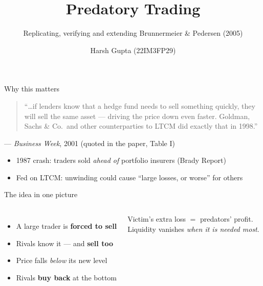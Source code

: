 \documentclass[aspectratio=169,11pt]{beamer}
\title{Predatory Trading}
\subtitle{Replicating, verifying and extending Brunnermeier \& Pedersen (2005)}
\author{Harsh Gupta \quad (22IM3FP29)}
\institute{Market Microstructure \quad$\cdot$\quad Prof.\ Ajay Kumar Mishra\\
  Indian Institute of Technology Kharagpur}
\date{}
\newcommand{\hl}[1]{\textbf{\color{prey}#1}}
\begin{document}
\maketitle

\begin{frame}{Why this matters}
  \begin{quote}
    ``\dots if lenders know that a hedge fund needs to sell something quickly,
    they will sell the same asset --- driving the price down even faster.
    Goldman, Sachs \& Co.\ and other counterparties to LTCM did exactly that in 1998.''
  \end{quote}
  \hfill --- \emph{Business Week}, 2001 (quoted in the paper, Table I)

  \vspace{1em}
  \begin{itemize}
    \item 1987 crash: traders sold \emph{ahead of} portfolio insurers (Brady Report)
    \item Fed on LTCM: unwinding could cause ``large losses, or worse'' for others
  \end{itemize}
\end{frame}

\begin{frame}{The idea in one picture}
  \begin{columns}[c]
    \begin{itemize}
      \item A large trader is \hl{forced to sell}
      \item Rivals know it --- and \hl{sell too}
      \item Price falls \emph{below} its new level
      \item Rivals \hl{buy back} at the bottom
    \end{itemize}
    \vspace{0.6em}
    Victim's extra loss $=$ predators' profit.\\
    Liquidity vanishes \emph{when it is needed most}.
  \end{columns}
\end{frame}
\end{document}
